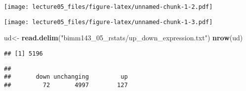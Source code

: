 \documentclass[]{article}
\newenvironment{Shaded}{\begin{snugshade}}{\end{snugshade}}
\newcommand{\KeywordTok}[1]{\textcolor[rgb]{0.13,0.29,0.53}{\textbf{#1}}}
\newcommand{\DataTypeTok}[1]{\textcolor[rgb]{0.13,0.29,0.53}{#1}}
\newcommand{\DecValTok}[1]{\textcolor[rgb]{0.00,0.00,0.81}{#1}}
\newcommand{\CharTok}[1]{\textcolor[rgb]{0.31,0.60,0.02}{#1}}
\newcommand{\StringTok}[1]{\textcolor[rgb]{0.31,0.60,0.02}{#1}}
\newcommand{\OtherTok}[1]{\textcolor[rgb]{0.56,0.35,0.01}{#1}}
\newcommand{\OperatorTok}[1]{\textcolor[rgb]{0.81,0.36,0.00}{\textbf{#1}}}
\newcommand{\NormalTok}[1]{#1}
\begin{document}
\texttt{[image: lecture05\_files/figure-latex/unnamed-chunk-1-2.pdf]}

\begin{Shaded}
\end{Shaded}

\texttt{[image: lecture05\_files/figure-latex/unnamed-chunk-1-3.pdf]}

\begin{Shaded}
\begin{Highlighting}[]
\NormalTok{ud<-}\StringTok{ }\KeywordTok{read.delim}\NormalTok{(}\StringTok{"bimm143_05_rstats/up_down_expression.txt"}\NormalTok{)}
\KeywordTok{nrow}\NormalTok{(ud)}
\end{Highlighting}
\end{Shaded}

\begin{verbatim}
## [1] 5196
\end{verbatim}

\begin{Shaded}
\end{Shaded}

\begin{verbatim}
## 
##       down unchanging         up 
##         72       4997        127
\end{verbatim}
\end{document}
